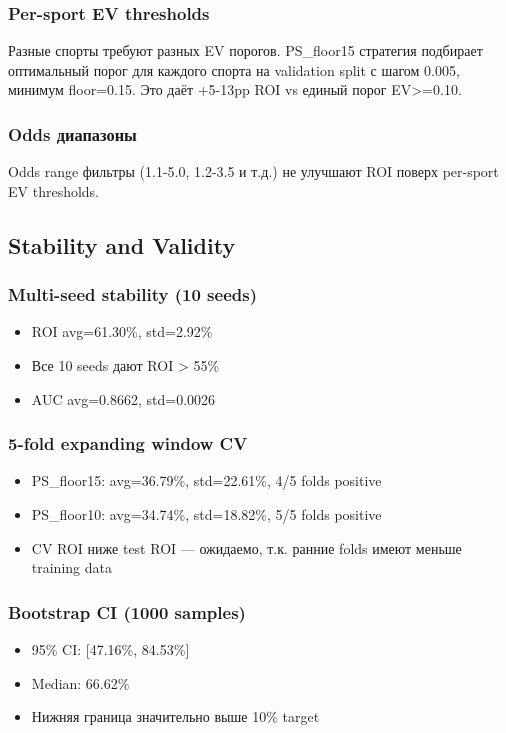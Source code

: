 \documentclass[12pt,a4paper]{article}
\begin{document}
\subsubsection{Per-sport EV thresholds}
Разные спорты требуют разных EV порогов. PS\_floor15 стратегия подбирает оптимальный порог для каждого спорта на validation split с шагом 0.005, минимум floor=0.15. Это даёт +5-13pp ROI vs единый порог EV>=0.10.

\subsubsection{Odds диапазоны}
Odds range фильтры (1.1-5.0, 1.2-3.5 и т.д.) не улучшают ROI поверх per-sport EV thresholds.

\subsection{Stability and Validity}

\subsubsection{Multi-seed stability (10 seeds)}
\begin{itemize}
  \item ROI avg=61.30\%, std=2.92\%
  \item Все 10 seeds дают ROI > 55\%
  \item AUC avg=0.8662, std=0.0026
\end{itemize}

\subsubsection{5-fold expanding window CV}
\begin{itemize}
  \item PS\_floor15: avg=36.79\%, std=22.61\%, 4/5 folds positive
  \item PS\_floor10: avg=34.74\%, std=18.82\%, 5/5 folds positive
  \item CV ROI ниже test ROI — ожидаемо, т.к. ранние folds имеют меньше training data
\end{itemize}

\subsubsection{Bootstrap CI (1000 samples)}
\begin{itemize}
  \item 95\% CI: [47.16\%, 84.53\%]
  \item Median: 66.62\%
  \item Нижняя граница значительно выше 10\% target
\end{itemize}
\end{document}
